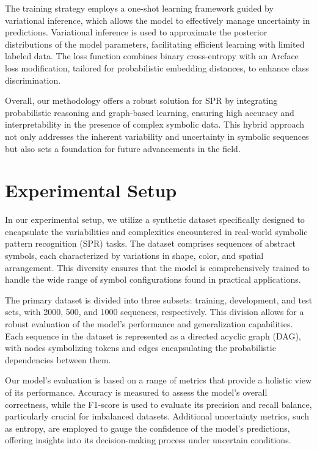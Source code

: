 \documentclass{article}
\begin{document}
The training strategy employs a one-shot learning framework guided by variational inference, which allows the model to effectively manage uncertainty in predictions. Variational inference is used to approximate the posterior distributions of the model parameters, facilitating efficient learning with limited labeled data. The loss function combines binary cross-entropy with an Arcface loss modification, tailored for probabilistic embedding distances, to enhance class discrimination.

Overall, our methodology offers a robust solution for SPR by integrating probabilistic reasoning and graph-based learning, ensuring high accuracy and interpretability in the presence of complex symbolic data. This hybrid approach not only addresses the inherent variability and uncertainty in symbolic sequences but also sets a foundation for future advancements in the field.

\section{Experimental Setup}
In our experimental setup, we utilize a synthetic dataset specifically designed to encapsulate the variabilities and complexities encountered in real-world symbolic pattern recognition (SPR) tasks. The dataset comprises sequences of abstract symbols, each characterized by variations in shape, color, and spatial arrangement. This diversity ensures that the model is comprehensively trained to handle the wide range of symbol configurations found in practical applications.

The primary dataset is divided into three subsets: training, development, and test sets, with 2000, 500, and 1000 sequences, respectively. This division allows for a robust evaluation of the model's performance and generalization capabilities. Each sequence in the dataset is represented as a directed acyclic graph (DAG), with nodes symbolizing tokens and edges encapsulating the probabilistic dependencies between them.

Our model's evaluation is based on a range of metrics that provide a holistic view of its performance. Accuracy is measured to assess the model's overall correctness, while the F1-score is used to evaluate its precision and recall balance, particularly crucial for imbalanced datasets. Additional uncertainty metrics, such as entropy, are employed to gauge the confidence of the model's predictions, offering insights into its decision-making process under uncertain conditions.
\end{document}
